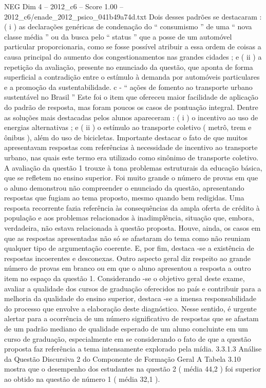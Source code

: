 \begin{textsample}{NEG Dim 4 – 2012\_c6 – Score 1.00 – 2012\_c6/enade\_2012\_psico\_041b49a74d.txt}
Dois desses padrões se destacaram : ( i ) as declarações genéricas de condenação do “ consumismo ” de uma “ nova classe média ” ou da busca pelo “ status ” que a posse de um automóvel particular proporcionaria, como se fosse possível atribuir a essa ordem de coisas a causa principal do aumento dos congestionamentos nas grandes cidades ; e ( ii ) a repetição da avaliação, presente no enunciado da questão, que aponta de forma superficial a contradição entre o estímulo à demanda por automóveis particulares e a promoção da sustentabilidade. c - “ ações de fomento ao transporte urbano sustentável no Brasil ” Este foi o item que ofereceu maior facilidade de aplicação do padrão de resposta, mas foram poucos os casos de pontuação integral.
Dentre as soluções mais destacadas pelos alunos apareceram : ( i ) o incentivo ao uso de energias alternativas ; e ( ii ) o estímulo ao transporte coletivo ( metrô, trem e ônibus ), além do uso de bicicletas.
Importante destacar o fato de que muitos apresentavam respostas com referências à necessidade de incentivo ao transporte urbano, nas quais este termo era utilizado como sinônimo de transporte coletivo.
A avaliação da questão 1 trouxe à tona problemas estruturais da educação básica, que se refletem no ensino superior.
Foi muito grande o número de provas em que o aluno demonstrou não compreender o enunciado da questão, apresentando respostas que fugiam ao tema proposto, mesmo quando bem redigidas.
Uma resposta recorrente fazia referência às consequências da ampla oferta de crédito à população e aos problemas relacionados à inadimplência, situação que, embora, verdadeira, não estava relacionada à questão proposta.
Houve, ainda, os casos em que as respostas apresentadas não só se afastaram do tema como não reuniam qualquer tipo de argumentação coerente.
E, por fim, destaca -se a existência de respostas incoerentes e desconexas.
Outro aspecto geral diz respeito ao grande número de provas em branco ou em que o aluno apresentou a resposta a outro item no espaço da questão 1.
Considerando -se o objetivo geral deste exame, avaliar a qualidade dos cursos de graduação oferecidos no país e contribuir para a melhoria da qualidade do ensino superior, destaca -se a imensa responsabilidade do processo que envolve a elaboração deste diagnóstico.
Nesse sentido, é urgente alertar para a ocorrência de um número significativo de respostas que se afastam de um padrão mediano de qualidade esperado de um aluno concluinte em um curso de graduação, especialmente em se considerando o fato de que a questão proposta faz referência a tema intensamente explorado pela mídia. 3.3.1.3 Análise da Questão Discursiva 2 do Componente de Formação Geral A Tabela 3.10 mostra que o desempenho dos estudantes na questão 2 ( média 44,2 ) foi superior ao obtido na questão de número 1 ( média 32,1 ).

\end{textsample}
